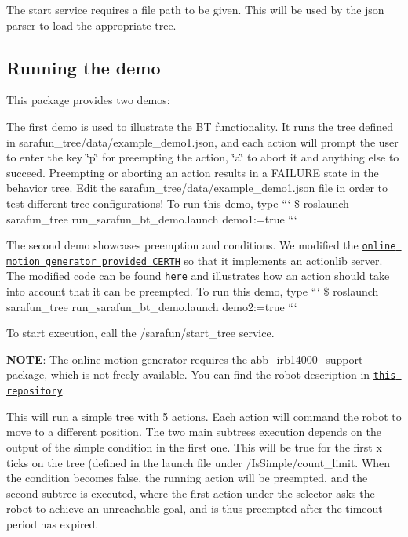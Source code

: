 The start service requires a file path to be given. This will be used by the json parser to load the appropriate tree.

\subsection*{Running the demo }

This package provides two demos\-:
\begin{DoxyItemize}
\item The first demo is used to illustrate the B\-T functionality. It runs the tree defined in {\ttfamily sarafun\-\_\-tree/data/example\-\_\-demo1.\-json}, and each action will prompt the user to enter the key \char`\"{}p\char`\"{} for preempting the action, \char`\"{}a\char`\"{} to abort it and anything else to succeed. Preempting or aborting an action results in a {\ttfamily F\-A\-I\-L\-U\-R\-E} state in the behavior tree. Edit the {\ttfamily sarafun\-\_\-tree/data/example\-\_\-demo1.\-json} file in order to test different tree configurations! To run this demo, type ``` \$ roslaunch sarafun\-\_\-tree run\-\_\-sarafun\-\_\-bt\-\_\-demo.\-launch demo1\-:=true ```
\item The second demo showcases preemption and conditions. We modified the \href{https://github.com/auth-arl/sarafun_online_motion_generation}{\tt online motion generator provided C\-E\-R\-T\-H} so that it implements an actionlib server. The modified code can be found \href{https://github.com/diogoalmeida/sarafun_online_motion_generation}{\tt here} and illustrates how an action should take into account that it can be preempted. To run this demo, type ``` \$ roslaunch sarafun\-\_\-tree run\-\_\-sarafun\-\_\-bt\-\_\-demo.\-launch demo2\-:=true ```
\end{DoxyItemize}

To start execution, call the {\ttfamily /sarafun/start\-\_\-tree} service.

{\bfseries N\-O\-T\-E}\-: The online motion generator requires the {\ttfamily abb\-\_\-irb14000\-\_\-support} package, which is not freely available. You can find the robot description in \href{https://github.com/rtkg/yumi}{\tt this repository}.

This will run a simple tree with 5 actions. Each action will command the robot to move to a different position. The two main subtrees execution depends on the output of the simple condition in the first one. This will be true for the first x ticks on the tree (defined in the launch file under {\ttfamily /\-Is\-Simple/count\-\_\-limit}. When the condition becomes false, the running action will be preempted, and the second subtree is executed, where the first action under the selector asks the robot to achieve an unreachable goal, and is thus preempted after the timeout period has expired.

